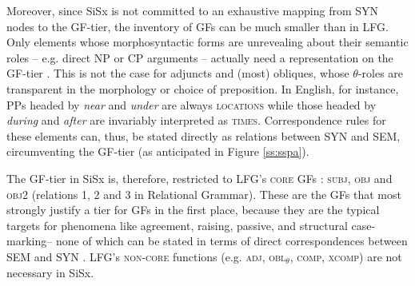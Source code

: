 \documentclass[output=paper,hidelinks]{langscibook}
\begin{document}
Moreover, since SiSx is not committed to an exhaustive mapping from SYN nodes to the GF-tier, the inventory of GFs can be much smaller than in LFG. Only elements whose morphosyntactic forms are unrevealing about their semantic roles -- e.g. direct NP or CP arguments -- actually need a representation on the GF-tier \citep[chapter~6]{culicover2019origin}. This is not the case for adjuncts and (most) obliques, whose $\theta$-roles are transparent in the morphology or choice of preposition. In English, for instance, PPs headed by \textit{near} and \textit{under} are always \textsc{locations} while those headed by \textit{during} and \textit{after} are invariably interpreted as \textsc{times}. Correspondence rules for these elements can, thus, be stated directly as relations between SYN and SEM, circumventing the GF-tier (as anticipated in Figure \ref{ss:sspa}). %



The GF-tier in SiSx is, therefore, restricted to LFG's \textsc{core} GFs \citep[96]{bresnan2001lexical}: \textsc{subj}, \textsc{obj} and \textsc{obj2} (relations 1, 2 and 3 in Relational Grammar). These are the GFs that most strongly justify a tier for GFs in the first place, because they are the typical targets for phenomena like agreement, raising, passive, and structural case-marking-- none of which can be stated in terms of direct correspondences between SEM and SYN  \citep[188--189]{culicover2005simpler}. LFG's \textsc{non-core} functions (e.g. \textsc{adj}, \textsc{obl}$_{\theta}$, \textsc{comp}, \textsc{xcomp}) are not necessary in SiSx. %
\end{document}
